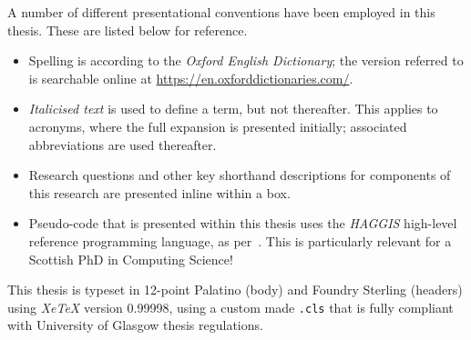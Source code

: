 
\begin{preamble}
{}

A number of different presentational conventions have been employed in this thesis. These are listed below for reference.

\begin{itemize}
    
    \item{Spelling is according to the \emph{Oxford English Dictionary}; the version referred to is searchable online at \url{https://en.oxforddictionaries.com/}.}
    
    \item{\emph{Italicised text} is used to define a term, but not thereafter. This applies to acronyms, where the full expansion is presented initially; associated abbreviations are used thereafter.}
    
    \item{Research questions and other key shorthand descriptions for components of this research are presented inline within a  box.}
    
    \item{Pseudo-code that is presented within this thesis uses the \emph{HAGGIS} high-level reference programming language, as per~\cite{cutts2014haggis}. This is particularly relevant for a Scottish PhD in Computing Science!}
    
\end{itemize}

This thesis is typeset in 12-point Palatino (body) and \metafont\selectfont Foundry Sterling (headers) \normalfont\selectfont using \emph{XeTeX} version 0.99998, using a custom made \texttt{.cls} that is fully compliant with University of Glasgow thesis regulations.
\end{preamble}
